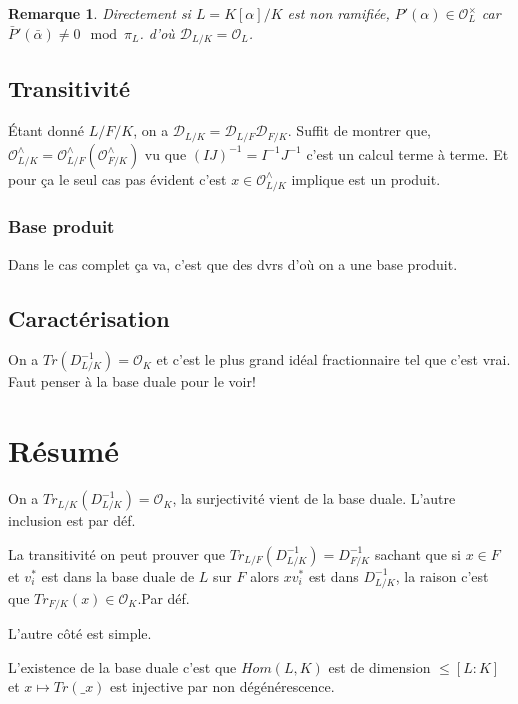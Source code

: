 \documentclass[a4paper,12pt]{book}
\newcommand{\Or}{\mathcal{O}}
\newcommand{\D}{\mathscr{D}}
\theoremstyle{plain}
\newtheorem{rem}{Remarque}
\theoremstyle{definition}
\theoremstyle{remark}
\begin{document}
\begin{rem}
    Directement si $L=K[\alpha]/K$ est non ramifiée, $P'(\alpha)\in \Or_L^\times$
    car $\bar P'(\bar \alpha)\ne 0\mod \pi_L$.
    d'où $\D_{L/K}=\Or_L$.
\end{rem}

\section{Transitivité}
Étant donné $L/F/K$, on a $\D_{L/K}=\D_{L/F}\D_{F/K}$. Suffit de
montrer
que, $\Or_{L/K}^\wedge=\Or_{L/F}^\wedge(\Or_{F/K}^\wedge)$ vu que 
$(IJ)^{-1}=I^{-1}J^{-1}$ c'est un calcul terme à terme. Et pour ça 
le seul cas pas évident c'est $x\in \Or_{L/K}^\wedge$ implique est
un produit.
\subsection{Base produit}
Dans le cas complet ça va, c'est que des dvrs d'où
on a une base produit. 

\section{Caractérisation}
On a $Tr(D_{L/K}^{-1})=\Or_K$ et c'est le plus grand idéal 
fractionnaire tel que c'est vrai. Faut penser à la base
duale pour le voir! 

\chapter{Résumé}
On a $Tr_{L/K}(D_{L/K}^{-1})=\Or_K$, la surjectivité vient de
la base duale. L'autre inclusion est par déf. 

La transitivité on peut prouver que 
$Tr_{L/F}(D_{L/K}^{-1})=D_{F/K}^{-1}$ sachant que si $x\in F$
et $v_i^*$ est dans la base duale de $L$ sur $F$ alors $xv_i^*$ 
est dans $D_{L/K}^{-1}$, la raison c'est que $Tr_{F/K}(x)\in\Or_K$.Par déf.

L'autre côté est simple.

L'existence de la base duale c'est que $Hom(L,K)$ est de
dimension $\leq [L:K]$ et $x\mapsto Tr(\_x)$ est injective par non
dégénérescence.
\end{document}
